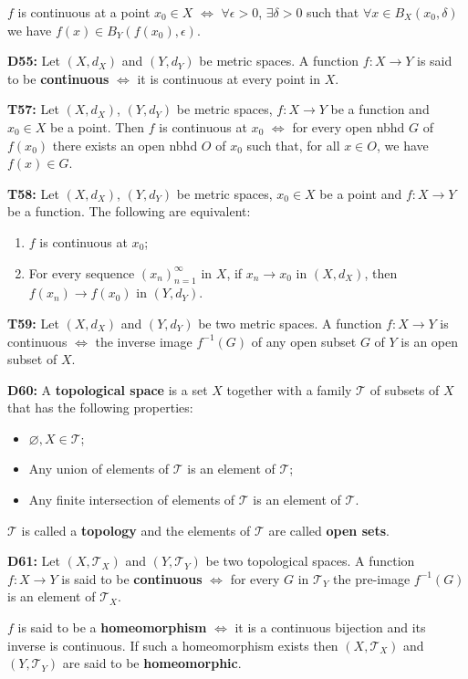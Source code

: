 \documentclass[twocolumn,10pt]{article}
\begin{document}
$f$ is continuous at a point $x_0\in X$ $\Leftrightarrow$ $\forall\epsilon>0$, $\exists\delta>0$ such that $\forall x\in B_X(x_0,\delta)$ we have $f(x)\in B_Y(f(x_0),\epsilon)$.

\textbf{D55:} Let $(X,d_X)$ and $(Y,d_Y)$ be metric spaces. A function $f:X\to Y$ is said to be \textbf{continuous} $\Leftrightarrow$ it is continuous at every point in $X$.


\textbf{T57:} Let $(X,d_X)$, $(Y,d_Y)$ be metric spaces, $f:X\to Y$ be a function and $x_0\in X$ be a point. Then $f$ is continuous at $x_0$ $\Leftrightarrow$ for every open nbhd $G$ of $f(x_0)$ there exists an open nbhd $O$ of $x_0$ such that, for all $x\in O$, we have $f(x)\in G$.

\textbf{T58:} Let $(X,d_X)$, $(Y,d_Y)$ be metric spaces, $x_0\in X$ be a point and $f:X\to Y$ be a function. The following are equivalent:
\begin{enumerate}
    \item $f$ is continuous at $x_0$;
    \item For every sequence $(x_n)_{n=1}^{\infty}$ in $X$, if $x_n\to x_0$ in $(X,d_X)$, then $f(x_n)\to f(x_0)$ in $(Y,d_Y)$.
\end{enumerate}
\textbf{T59:} Let $(X,d_X)$ and $(Y,d_Y)$ be two metric spaces. A function $f:X\to Y$ is continuous $\Leftrightarrow$ the inverse image $f^{-1}(G)$ of any open subset $G$ of $Y$ is an open subset of $X$.

\textbf{D60:} A \textbf{topological space} is a set $X$ together with a family $\mathcal{T}$ of subsets of $X$ that has the following properties:
\begin{itemize}
    \item $\varnothing,X\in\mathcal{T}$;
    \item Any union of elements of $\mathcal{T}$ is an element of $\mathcal{T}$;
    \item Any finite intersection of elements of $\mathcal{T}$ is an element of $\mathcal{T}$.
\end{itemize}
$\mathcal{T}$ is called a \textbf{topology} and the elements of $\mathcal{T}$ are called \textbf{open sets}.

\textbf{D61:} Let $(X,\mathcal{T}_X)$ and $(Y,\mathcal{T}_Y)$ be two topological spaces. A function $f:X\to Y$ is said to be \textbf{continuous} $\Leftrightarrow$ for every $G$ in $\mathcal{T}_Y$ the pre-image $f^{-1}(G)$ is an element of $\mathcal{T}_X$.

$f$ is said to be a \textbf{homeomorphism} $\Leftrightarrow$ it is a continuous bijection and its inverse is continuous. If such a homeomorphism exists then $(X,\mathcal{T}_X)$ and $(Y,\mathcal{T}_Y)$ are said to be \textbf{homeomorphic}.
\end{document}
